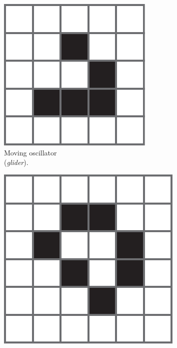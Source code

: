 \begin{figure}[htbp]
  \centering
  \begin{subfigure}[t]{.31\linewidth}
    \centering
    \includegraphics[width=\linewidth]{figures/glider.pdf}
    \caption{Moving oscillator\\ (\emph{glider}).}
    \label{fig:glider}
  \end{subfigure}
  \begin{subfigure}[t]{.31\linewidth}
    \centering
    \includegraphics[width=\linewidth]{figures/still_life.pdf}

\end{subfigure}
\end{figure}
